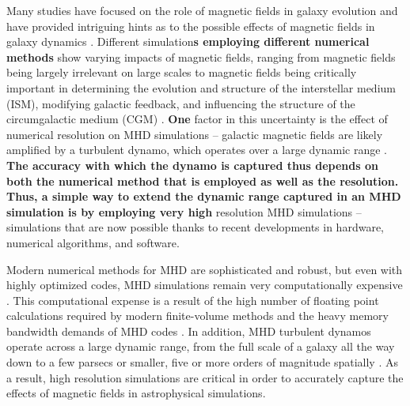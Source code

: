 \documentclass[modern, linenumbers]{aastex631}
\begin{document}
Many studies have focused on the role of magnetic fields in galaxy evolution and have provided intriguing hints as to the possible effects of magnetic fields in galaxy dynamics \citep{shin_2008, banda_2016, grand_auriga_2017, pakmor_magnetic_2017, hopkins_but_2020, wibking_2021}. Different simulation\textbf{s employing different numerical methods} show varying impacts of magnetic fields, ranging from magnetic fields being largely irrelevant on large scales to magnetic fields being critically important in determining the evolution and structure of the interstellar medium (ISM), modifying galactic feedback, and influencing the structure of the circumgalactic medium (CGM) \citep{martin-alvarez_how_2020, dobbs_magnetic_2007, kim_vertical_2015, hanasz_global_2009, pakmor_simulations_2013, banda_2017}. \textbf{One} factor in this uncertainty is the effect of numerical resolution on MHD simulations -- galactic magnetic fields are likely amplified by a turbulent dynamo, which operates over a large dynamic range \citep{martin-alvarez_three-phase_2018, beck_1996, gent_2021, carteret_2022, brandenburg_2023}. \textbf{The accuracy with which the dynamo is captured thus depends on both the numerical method that is employed as well as the resolution. Thus, a simple way to extend the dynamic range captured in an MHD simulation is by employing very high} resolution MHD simulations -- simulations that are now possible thanks to recent developments in hardware, numerical algorithms, and software.

Modern numerical methods for MHD are sophisticated and robust, but even with highly optimized codes, MHD simulations remain very computationally expensive \citep{athena++_2020}. This computational expense is a result of the high number of floating point calculations required by modern finite-volume methods and the heavy memory bandwidth demands of MHD codes \citep{k_athena_2021}. In addition, MHD turbulent dynamos operate across a large dynamic range, from the full scale of a galaxy all the way down to a few parsecs or smaller, five or more orders of magnitude spatially \citep{pariev_magnetic_1_2007, pariev_magnetic_2_2007, ntormousi_dynamo_2020, galishnikova_tearing_2022}. As a result, high resolution simulations are critical in order to accurately capture the effects of magnetic fields in astrophysical simulations. 
\end{document}
